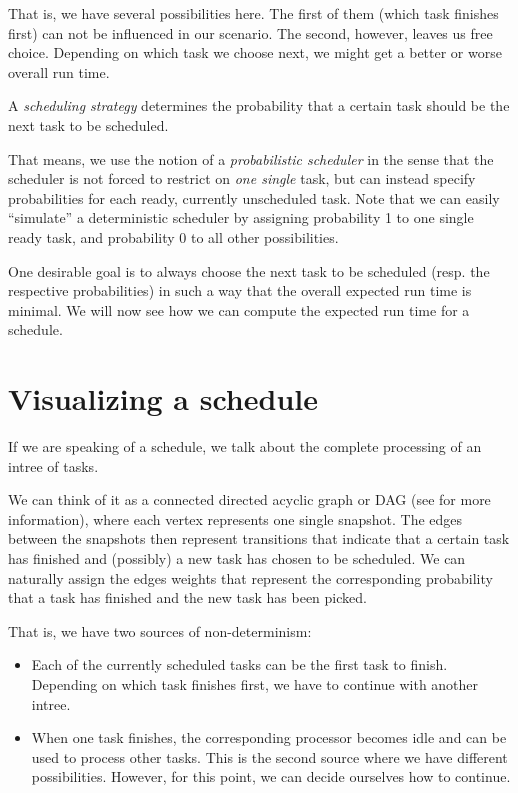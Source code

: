 That is, we have several possibilities here. The first of them (which task finishes first) can not be influenced in our scenario. The second, however, leaves us free choice. Depending on which task we choose next, we might get a better or worse overall run time.

\begin{definition}
  A \emph{scheduling strategy} determines the probability that a certain task should be the next task to be scheduled.
\end{definition}

That means, we use the notion of a \emph{probabilistic scheduler} in the sense that the scheduler is not forced to restrict on \emph{one single} task, but can instead specify probabilities for each ready, currently unscheduled task. Note that we can easily ``simulate'' a deterministic scheduler by assigning probability 1 to one single ready task, and probability 0 to all other possibilities.

One desirable goal is to always choose the next task to be scheduled (resp. the respective probabilities) in such a way that the overall expected run time is minimal. We will now see how we can compute the expected run time for a schedule.


\section{Visualizing a schedule}
\label{sec:intro-visualizing-schedules}

If we are speaking of a schedule, we talk about the complete processing of an intree of tasks.

We can think of it as a connected directed acyclic graph or DAG (see \cite{diestel2005graph} for more information), where each vertex represents one single snapshot. The edges between the snapshots then represent transitions that indicate that a certain task has finished and (possibly) a new task has chosen to be scheduled. We can naturally assign the edges weights that represent the corresponding probability that a task has finished and the new task has been picked.

That is, we have two sources of non-determinism:
\begin{itemize}
\item Each of the currently scheduled tasks can be the first task to finish. Depending on which task finishes first, we have to continue with another intree.
\item When one task finishes, the corresponding processor becomes idle and can be used to process other tasks. This is the second source where we have different possibilities. However, for this point, we can decide ourselves how to continue.
\end{itemize}

